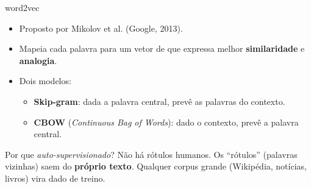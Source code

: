 \begin{frame}{word2vec \cite{mikolov2013efficient, mikolov2013distributed}}
    \begin{itemize}
        \item Proposto por Mikolov et al. (Google, 2013).
        \item Mapeia cada palavra para um vetor de  que expressa melhor \textbf{similaridade} e \textbf{analogia}.
        \item Dois modelos:
        \begin{itemize}
            \item \textbf{Skip-gram}: dada a palavra central, prevê as palavras do contexto.
            \item \textbf{CBOW} (\textit{Continuous Bag of Words}): dado o contexto, prevê a palavra central.
        \end{itemize}
    \end{itemize}

    \begin{block}{Por que \textit{auto-supervisionado}?}
        Não há rótulos humanos. Os ``rótulos'' (palavras vizinhas) saem do \textbf{próprio texto}. Qualquer corpus grande (Wikipédia, notícias, livros) vira dado de treino.
    \end{block}
\end{frame}

